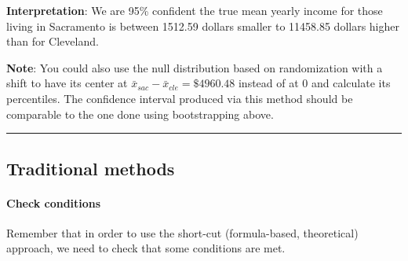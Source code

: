 \documentclass[]{tufte-book}
\let\oldrule=\rule
\renewcommand{\rule}[1]{\oldrule{\linewidth}}
\theoremstyle{definition}
\theoremstyle{definition}
\theoremstyle{remark}
\begin{document}
\textbf{Interpretation}: We are 95\% confident the true mean yearly
income for those living in Sacramento is between 1512.59 dollars smaller
to 11458.85 dollars higher than for Cleveland.

\textbf{Note}: You could also use the null distribution based on
randomization with a shift to have its center at
\(\bar{x}_{sac} - \bar{x}_{cle} = \$4960.48\) instead of at 0 and
calculate its percentiles. The confidence interval produced via this
method should be comparable to the one done using bootstrapping above.

\begin{center}\rule{0.5\linewidth}{\linethickness}\end{center}

\subsection{Traditional methods}\label{traditional-methods-3}

\paragraph{Check conditions}\label{check-conditions-3}

Remember that in order to use the short-cut (formula-based, theoretical)
approach, we need to check that some conditions are met.
\end{document}
